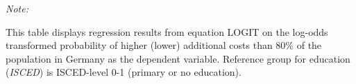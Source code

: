 \begin{table}[htbp!]
\begin{adjustbox}{width = 1\textwidth, max height = 0.95\textheight, center}
\begin{threeparttable}[b]
         \begin{tablenotes}\item \medskip \textit{Note:}
            \item This table displays regression results from equation LOGIT on the log-odds transformed probability of higher (lower) additional costs than 80\% of the population in Germany as the dependent variable. Reference group for education (\textit{ISCED}) is ISCED-level 0-1 (primary or no education).
         \end{tablenotes}
      \end{threeparttable}
   \end{adjustbox}
\end{table}


